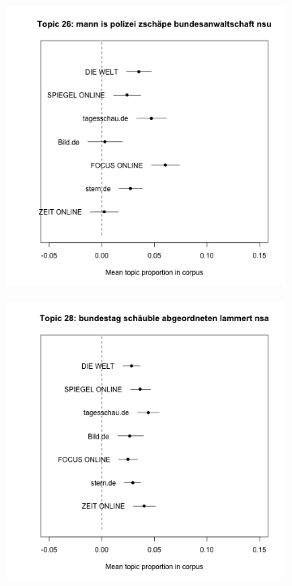 \documentclass[12pt,a4paper,notitlepage]{article}
\begin{document}
\begin{figure}[H]
\begin{center}
\begin{subfigure}[normla]{0.2\textwidth}
		\end{subfigure}
				\begin{subfigure}[normla]{0.2\textwidth}
			\includegraphics[width=\textwidth]{../figs/estimate_effect26.png}
		\end{subfigure}
				\begin{subfigure}[normla]{0.2\textwidth}
			\includegraphics[width=\textwidth]{../figs/estimate_effect28.png}
		\end{subfigure}
	\end{center}
	\label{fig_estimateEffects_full2}
\end{figure}
\end{document}
